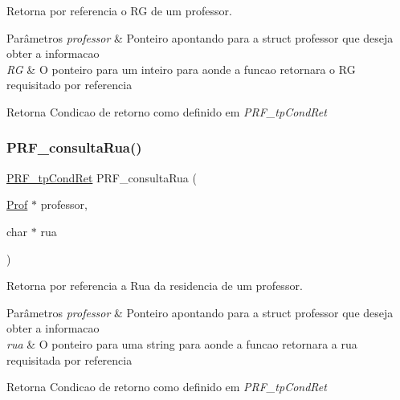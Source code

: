 Retorna por referencia o RG de um professor. 


\begin{DoxyParams}{Parâmetros}
{\em professor} & Ponteiro apontando para a struct professor que deseja obter a informacao \\
\hline
{\em RG} & O ponteiro para um inteiro para aonde a funcao retornara o RG requisitado por referencia \\
\hline
\end{DoxyParams}
\begin{DoxyReturn}{Retorna}
Condicao de retorno como definido em {\itshape P\+R\+F\+\_\+tp\+Cond\+Ret} 
\end{DoxyReturn}
\mbox{\label{group__funcoes_consulta_ga81a5d9fbbd4075120126fb58850c46c5}} 
\subsubsection{\texorpdfstring{P\+R\+F\+\_\+consulta\+Rua()}{PRF\_consultaRua()}}
{\footnotesize\ttfamily \hyperlink{group__modulo_professor_ga777e215896d573d2e99d98793b1f0ed1}{P\+R\+F\+\_\+tp\+Cond\+Ret} P\+R\+F\+\_\+consulta\+Rua (\begin{DoxyParamCaption}\item[{\hyperlink{structprof}{Prof} $\ast$}]{professor,  }\item[{char $\ast$}]{rua }\end{DoxyParamCaption})}



Retorna por referencia a Rua da residencia de um professor. 


\begin{DoxyParams}{Parâmetros}
{\em professor} & Ponteiro apontando para a struct professor que deseja obter a informacao \\
\hline
{\em rua} & O ponteiro para uma string para aonde a funcao retornara a rua requisitada por referencia \\
\hline
\end{DoxyParams}
\begin{DoxyReturn}{Retorna}
Condicao de retorno como definido em {\itshape P\+R\+F\+\_\+tp\+Cond\+Ret} 
\end{DoxyReturn}
\mbox{\label{group__funcoes_consulta_gaeb7c31b9566b846bf56494458a0c6bd9}} 
